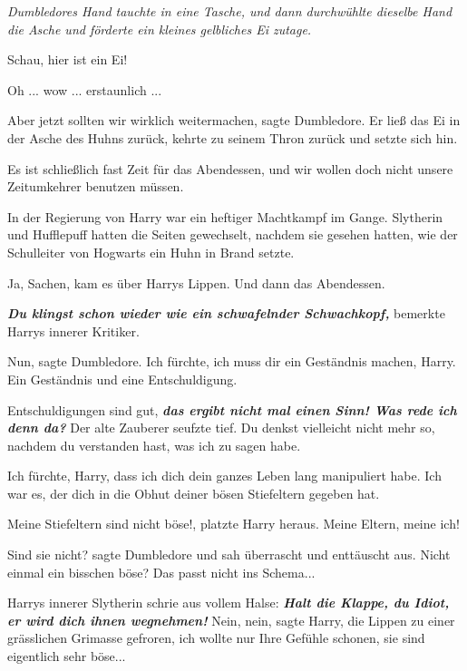\emph{Dumbledores Hand tauchte in eine Tasche, und dann durchwühlte dieselbe
Hand die Asche und förderte ein kleines gelbliches Ei zutage.}

\glqq Schau, hier ist ein Ei!\grqq{}

\glqq Oh ... wow ... erstaunlich ...\grqq{}

\glqq Aber jetzt sollten wir wirklich weitermachen\grqq{}, sagte Dumbledore. Er
ließ das Ei in der Asche des Huhns zurück, kehrte zu seinem Thron zurück und
setzte sich hin.

\glqq Es ist schließlich fast Zeit für das Abendessen, und wir wollen doch nicht
unsere Zeitumkehrer benutzen müssen.\grqq{}

In der Regierung von Harry war ein heftiger Machtkampf im Gange. Slytherin und
Hufflepuff hatten die Seiten gewechselt, nachdem sie gesehen hatten, wie der
Schulleiter von Hogwarts ein Huhn in Brand setzte.

\glqq Ja, Sachen\grqq{}, kam es über Harrys Lippen. \glqq Und dann das
Abendessen.\grqq{}

\textbf{\emph{Du klingst schon wieder wie ein schwafelnder Schwachkopf,
}}bemerkte Harrys innerer Kritiker.

\glqq Nun\grqq{}, sagte Dumbledore. \glqq Ich fürchte, ich muss dir ein
Geständnis machen, Harry. Ein Geständnis und eine Entschuldigung.\grqq{}

\glqq Entschuldigungen sind gut\grqq{}, \textbf{\emph{das ergibt nicht mal einen
Sinn! Was rede ich denn da?}} Der alte Zauberer seufzte tief. \glqq Du denkst
vielleicht nicht mehr so, nachdem du verstanden hast, was ich zu sagen habe.

Ich fürchte, Harry, dass ich dich dein ganzes Leben lang manipuliert habe. Ich
war es, der dich in die Obhut deiner bösen Stiefeltern gegeben hat.\grqq{}

\glqq Meine Stiefeltern sind nicht böse!\grqq{}, platzte Harry heraus. \glqq
Meine Eltern, meine ich!\grqq{}

\glqq Sind sie nicht?\grqq{} sagte Dumbledore und sah überrascht und enttäuscht
aus. \glqq Nicht einmal ein bisschen böse? Das passt nicht ins Schema...\grqq{}

Harrys innerer Slytherin schrie aus vollem Halse: \glqq \textbf{\emph{Halt die
Klappe, du Idiot, er wird dich ihnen wegnehmen!}} \glqq Nein, nein\grqq{}, sagte
Harry, die Lippen zu einer grässlichen Grimasse gefroren, \glqq ich wollte nur
Ihre Gefühle schonen, sie sind eigentlich sehr böse...\grqq{}


